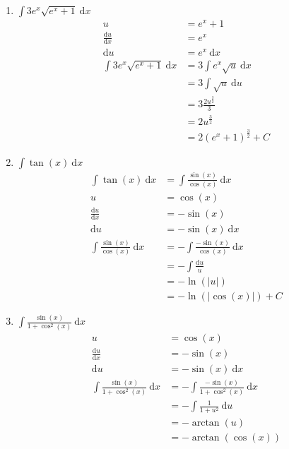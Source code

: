 \documentclass[10pt]{article}
\begin{document}
\begin{enumerate}[start=5,leftmargin=1in]
\begin{enumerate}
        \item $\int 3 e^x \sqrt{e^x + 1} \: \text{d}x$ 
        \begin{align*}
            u &= e^x + 1 \\
            \frac{\text{d}u}{\text{d}x} &= e^x \\
            \text{d}u &= e^x \: \text{d}x \\
            \int 3 e^x \sqrt{e^x + 1} \: \text{d}x &= 3 \int e^x \sqrt{u} \: \text{d}x \\
            &= 3 \int \sqrt{u} \: \text{d}u \\
            &= 3 \frac{2 u^{\frac{3}{2}}}{3} \\
            &= 2 u^{\frac{3}{2}} \\
            &= 2 (e^x + 1)^{\frac{3}{2}} + C
        \end{align*}

        \item $\int \tan(x) \: \text{d}x$
        \begin{align*}
            \int \tan(x) \: \text{d}x &= \int \frac{\sin(x)}{\cos(x)} \: \text{d}x \\
            u &= \cos(x) \\
            \frac{\text{d}u}{\text{d}x} &= - \sin(x) \\
            \text{d}u &= - \sin(x) \: \text{d}x \\
            \int \frac{\sin(x)}{\cos(x)} \: \text{d}x &= - \int \frac{- \sin(x)}{\cos(x)} \: \text{d}x \\
            &= - \int \frac{\text{d}u}{u} \: \\
            &= - \ln(|u|) \\
            &= - \ln(|\cos(x)|) + C
        \end{align*}

        \item $\int \frac{\sin(x)}{1 + \cos^2(x)} \: \text{d}x$
        \begin{align*}
            u &= \cos(x) \\
            \frac{\text{d}u}{\text{d}x} &= - \sin(x) \\
            \text{d}u &= - \sin(x) \: \text{d}x \\
            \int \frac{\sin(x)}{1 + \cos^2(x)} \: \text{d}x &= - \int \frac{- \sin(x)}{1 + \cos^2(x)} \: \text{d}x \\
            &= - \int \frac{1}{1 + u^2} \: \text{d}u \\
            &= - \arctan(u) \\
            &= - \arctan(\cos(x))
        \end{align*}


\end{enumerate}
\end{enumerate}
\end{document}
